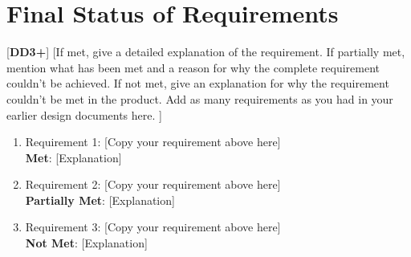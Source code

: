 \clearpage
\section{Final Status of Requirements}
 [\textbf{DD3+}]
 [If met, give a detailed explanation of the requirement. If partially met, mention what has been met and a reason for why the complete requirement couldn’t be achieved. If not met, give an explanation for why the requirement couldn’t be met in the product. Add as many requirements as you had in your earlier design documents here. ]
\begin{enumerate}
    \item Requirement 1: [Copy your requirement above here] \\
          \textbf{Met}: [Explanation]
    \item Requirement 2: [Copy your requirement above here] \\
          \textbf{Partially Met}: [Explanation]
    \item Requirement 3: [Copy your requirement above here] \\
          \textbf{Not Met}: [Explanation]
\end{enumerate}